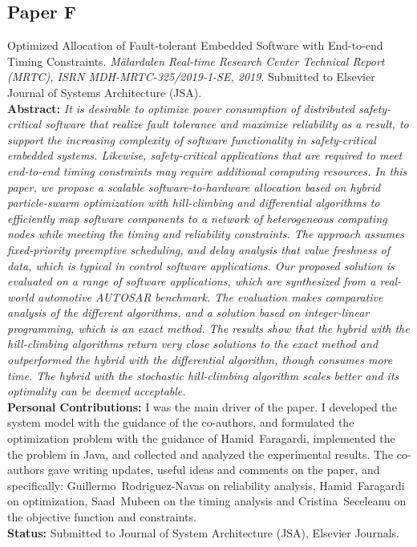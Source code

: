 \subsection*{Paper F}
Optimized Allocation of Fault-tolerant Embedded Software with End-to-end Timing Constraints.	\textit{M\"{a}lardalen Real-time Research Center Technical Report (MRTC), ISRN MDH-MRTC-325/2019-1-SE, 2019}. Submitted to Elsevier Journal of Systems Architecture (JSA).\\[6pt]%
\textbf{Abstract:} \textit{It is desirable to optimize power consumption of distributed safety-critical software that realize fault tolerance and maximize reliability as a result, to support the increasing complexity of software functionality in safety-critical embedded systems. Likewise, safety-critical applications that are required to meet end-to-end timing constraints may require additional computing resources. In this paper, we propose a scalable software-to-hardware allocation based on hybrid particle-swarm optimization with hill-climbing and differential algorithms to efficiently map software components to a network of heterogeneous computing nodes while meeting the timing and reliability constraints. The approach assumes fixed-priority preemptive scheduling, and delay analysis that value freshness of data, which is typical in control software applications.
Our proposed solution is evaluated on a range of software applications, which are synthesized from a real-world automotive AUTOSAR benchmark. The evaluation makes comparative analysis of the different algorithms, and a solution based on integer-linear programming, which is an exact method. The results show that the hybrid with the hill-climbing algorithms return very close solutions to the exact method and outperformed the hybrid with the differential algorithm, though consumes more time. The hybrid with the stochastic hill-climbing algorithm scales better and its optimality can be deemed acceptable.}\\[6pt]%
\textbf{Personal Contributions: } I was the main driver of the paper. I developed the system model with the guidance of the co-authors, and formulated the optimization problem with the guidance of Hamid~Faragardi, implemented the the problem in Java, and collected and analyzed the experimental results. The co-authors gave writing updates, useful ideas and comments on the paper, and specifically: Guillermo~Rodriguez-Navas on reliability analysis, Hamid~Faragardi on optimization, Saad~Mubeen on the timing analysis and Cristina~Seceleanu on the objective function and constraints. \\%
\textbf{Status:} Submitted to Journal of System Architecture (JSA), Elsevier Journals.\\
